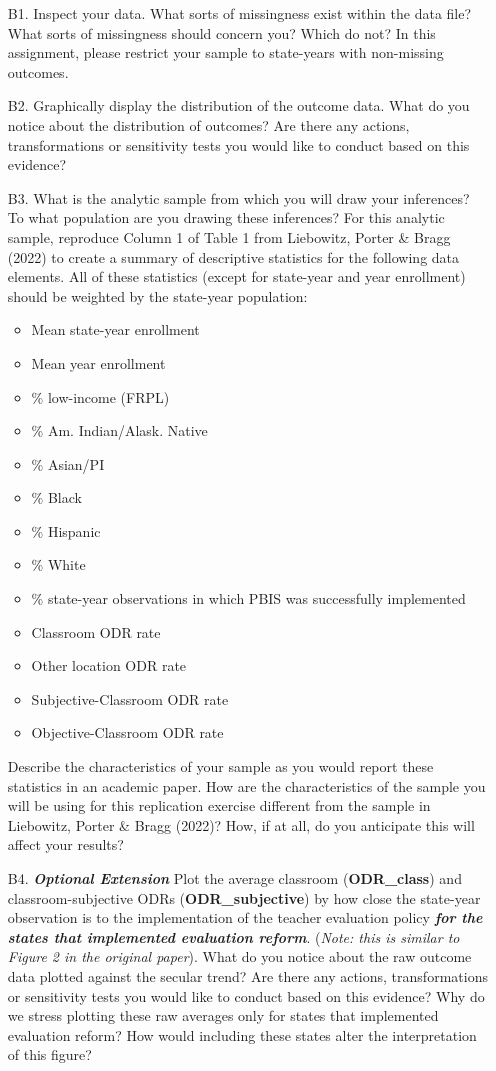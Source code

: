 \documentclass[a4paper, 11pt]{article}
\begin{document}
\begin{enumerate}
	\item[B1.] Inspect your data. What sorts of missingness exist within the data file? What sorts of missingness should concern you? Which do not? In this assignment, please restrict your sample to state-years with non-missing outcomes.
	\item[B2.] Graphically display the distribution of the outcome data. What do you notice about the distribution of outcomes? Are there any actions, transformations or sensitivity tests you would like to conduct based on this evidence?
	\item[B3.] What is the analytic sample from which you will draw your inferences? To what population are you drawing these inferences? For this analytic sample, reproduce Column 1 of Table 1 from Liebowitz, Porter \& Bragg (2022) to create a summary of descriptive statistics for the following data elements. All of these statistics (except for state-year and year enrollment) should be weighted by the state-year population:

	\begin{itemize} 
		\item Mean state-year enrollment 
		\item Mean year enrollment
		\item \% low-income (FRPL)
		\item \% Am. Indian/Alask. Native
		\item \% Asian/PI
		\item \% Black
		\item \% Hispanic
		\item \% White
		\item \% state-year observations in which PBIS was successfully implemented
		\item Classroom ODR rate
		\item Other location ODR rate
		\item Subjective-Classroom ODR rate
		\item Objective-Classroom ODR rate
\end{itemize}

Describe the characteristics of your sample as you would report these statistics in an academic paper. How are the characteristics of the sample you will be using for this replication exercise different from the sample in Liebowitz, Porter \& Bragg (2022)? How, if at all, do you anticipate this will affect your results?
	\item[B4.] \textbf{\textit{Optional Extension}} Plot the average classroom (\textbf{ODR\_class}) and classroom-subjective ODRs (\textbf{ODR\_subjective}) by how close the state-year observation is to the implementation of the teacher evaluation policy \textbf{\textit{for the states that implemented evaluation reform}}. (\textit{Note: this is similar to Figure 2 in the original paper}). What do you notice about the raw outcome data plotted against the secular trend? Are there any actions, transformations or sensitivity tests you would like to conduct based on this evidence? Why do we stress plotting these raw averages only for states that implemented evaluation reform? How would including these states alter the interpretation of this figure?


\end{enumerate}
\end{document}
